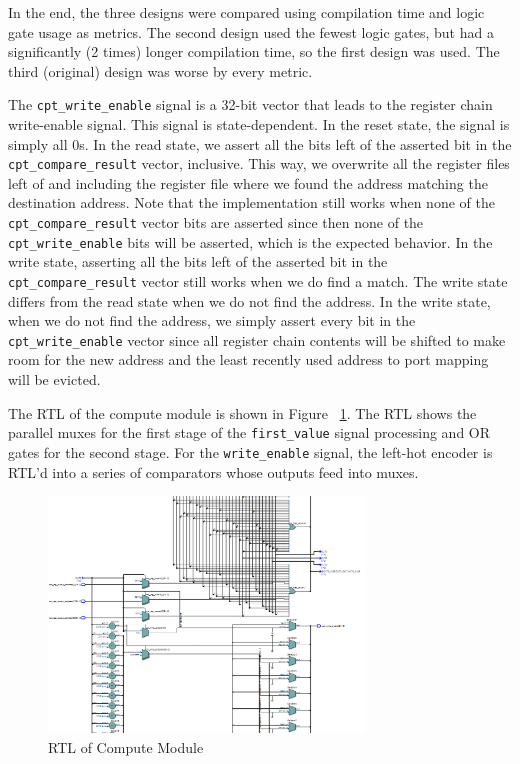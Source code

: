 \documentclass{article}
\begin{document}
In the end, the three designs were compared using compilation time and logic gate usage as metrics. The second design used the fewest logic gates, but had a significantly (2 times) longer compilation time, so the first design was used. The third (original) design was worse by every metric. 

The \texttt{cpt\_write\_enable} signal is a 32-bit vector that leads to the register chain write-enable signal. This signal is state-dependent. In the reset state, the signal is simply all 0s. In the read state, we assert all the bits left of the asserted bit in the \texttt{cpt\_compare\_result} vector, inclusive. This way, we overwrite all the register files left of and including the register file where we found the address matching the destination address. Note that the implementation still works when none of the \texttt{cpt\_compare\_result} vector bits are asserted since then none of the \texttt{cpt\_write\_enable} bits will be asserted, which is the expected behavior. In the write state, asserting all the bits left of the asserted bit in the \texttt{cpt\_compare\_result} vector still works when we do find a match. The write state differs from the read state when we do not find the address. In the write state, when we do not find the address, we simply assert every bit in the \texttt{cpt\_write\_enable} vector since all register chain contents will be shifted to make room for the new address and the least recently used address to port mapping will be evicted.

The RTL of the compute module is shown in Figure ~\ref{fig:compute-rtl}. The RTL shows the parallel muxes for the first stage of the \texttt{first\_value} signal processing and OR gates for the second stage. For the \texttt{write\_enable} signal, the left-hot encoder is RTL'd into a series of comparators whose outputs feed into muxes. 

\begin{figure}[ht!]
  \centering
    \includegraphics[width=0.75\textwidth]{compute_rtl.PNG}
  \caption{RTL of Compute Module}
  \label{fig:compute-rtl}
\end{figure}
\end{document}
